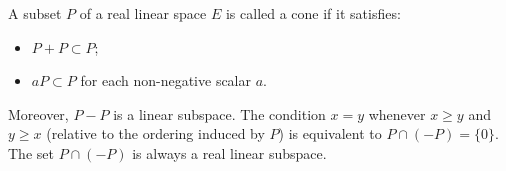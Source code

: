 A subset $P$ of a real linear space $E$ is called a cone if it satisfies:
\begin{itemize}
\item $P + P \subset P$;
\item $aP \subset P$ for each non-negative scalar $a$.
\end{itemize}
Moreover, $P - P$ is a linear subspace. The condition $x = y$ whenever $x \geq y$ and $y \geq x$ (relative to the ordering induced by $P$) is equivalent to $P \cap (-P) = \{0\}$. The set $P \cap (-P)$ is always a real linear subspace.
